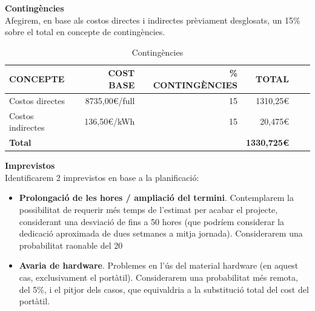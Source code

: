 \noindent \textbf{\large Contingències}\\

\noindent Afegirem, en base als costos directes i indirectes prèviament desglosats, un 15\% sobre el total en concepte de contingències.

\begin{table}[htb]
\centering
\label{PressupostContingencies}
\begin{tabular}{lrrrrr}
\hline \textbf{CONCEPTE}                           & {\color[HTML]{000000} \textbf{COST BASE}} & {\color[HTML]{000000} \textbf{\% CONTINGÈNCIES}} & {\color[HTML]{000000} \textbf{TOTAL}}\\ 
\hline
Costos directes                             & 8735,00\euro /full                                           & 15                                             & 1310,25\euro\\
Costos indirectes                                 & 136,50\euro /kWh                                           & 15                                           & 20,475\euro\\
\hline
\textbf{Total}                               &                              &                                & \textbf{1330,725\euro}       \\
\hline                      
\end{tabular}%
\caption{Contingències}
\end{table}

\noindent \textbf{\large Imprevistos}\\

\noindent Identificarem 2 imprevistos en base a la planificació:

\begin{itemize}
\item \textbf{Prolongació de les hores / ampliació del termini}. Contemplarem la possibilitat de requerir més temps de l’estimat per acabar el projecte, considerant una desviació de fins a 50 hores (que podríem considerar la dedicació aproximada de dues setmanes a mitja jornada). Considerarem una probabilitat raonable del 20%
\item \textbf{Avaria de hardware}. Problemes en l’ús del material hardware (en aquest cas, exclusivament el portàtil). Considerarem una probabilitat més remota, del 5\%, i el pitjor dels casos, que equivaldria a la substitució total del cost del portàtil.
\end{itemize}

